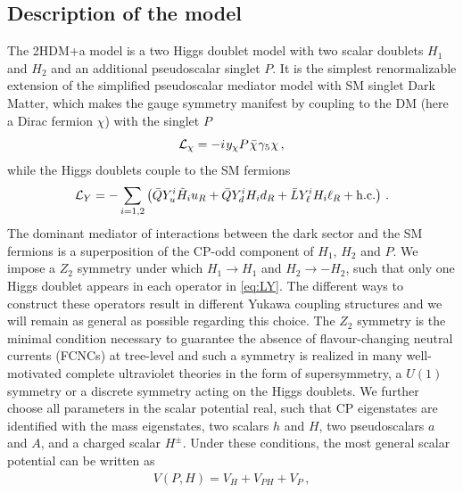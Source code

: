 




\subsection{Description of the model}
The 2HDM+a model is a two Higgs doublet model with two scalar doublets $H_1$ and $H_2$ and an additional pseudoscalar singlet $P$. It is the simplest renormalizable extension of the simplified pseudoscalar mediator model with SM singlet Dark Matter, which makes the gauge symmetry manifest by coupling to the DM (here a Dirac fermion $\chi$) with the singlet $P$
%
\begin{equation} \label{eq:Lx}
{\cal L}_\chi = - i \hspace{0.25mm} y_\chi P \hspace{0.25mm} \bar \chi \hspace{0.25mm} \gamma_5 \hspace{0.1mm} \chi \,,
\end{equation}
while the Higgs doublets couple to the SM fermions 
\begin{equation} \label{eq:LY}
{\cal L}_{Y} = - \sum_{i=1,2} \left ( \bar Q Y_u^i \tilde H_i u_R  + \bar Q Y_d^i H_i d_R   + \bar L Y_\ell^i H_i \ell_R  + {\rm h.c.}  \right ) \,.
\end{equation}
The dominant mediator of interactions between the dark sector and the SM fermions is a superposition of the CP-odd component of $H_1$, $H_2$ and $P$. 
We impose a $Z_2$ symmetry under which $H_1\to H_1$ and $H_2\to -H_2$, such that only one Higgs doublet appears in each operator in \eqref{eq:LY}. The different ways to construct these operators result in different Yukawa coupling structures and we will remain as general as possible regarding this choice. 
The $Z_2$ symmetry is the minimal condition necessary to guarantee the absence of flavour-changing neutral currents (FCNCs) at tree-level \cite{Glashow:1976nt,Paschos:1976ay} and such a symmetry is realized in many well-motivated complete ultraviolet theories in the form of supersymmetry, a $U(1)$ symmetry or  a discrete symmetry acting on the Higgs doublets. We further choose all parameters in the scalar potential real, such that CP eigenstates are identified with the mass eigenstates, two scalars $h$ and $H$, two pseudoscalars $a$ and $A$, and a charged scalar $H^\pm$. Under these conditions, the most general scalar potential can be written as 
\begin{align}
V(P,H)=V_H+V_{PH}+V_P\,,
\end{align}
